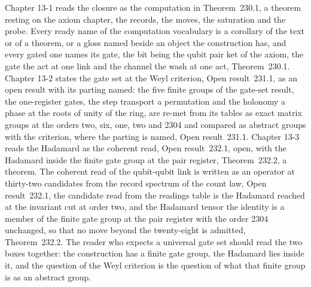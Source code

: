 Chapter 13-1 reads the closure as the computation in Theorem~230.1, a theorem resting on the axiom chapter, the records, the moves, the saturation and the probe. Every ready name of the computation vocabulary is a corollary of the text or of a theorem, or a gloss named beside an object the construction has, and every gated one names its gate, the bit being the qubit pair ket of the axiom, the gate the act at one link and the channel the wash at one act, Theorem~230.1. Chapter 13-2 states the gate set at the Weyl criterion, Open result~231.1, as an open result with its parting named: the five finite groups of the gate-set result, the one-register gates, the step transport a permutation and the holonomy a phase at the roots of unity of the ring, are re-met from its tables as exact matrix groups at the orders two, six, one, two and 2304 and compared as abstract groups with the criterion, where the parting is named, Open result~231.1. Chapter 13-3 reads the Hadamard as the coherent read, Open result~232.1, open, with the Hadamard inside the finite gate group at the pair register, Theorem~232.2, a theorem. The coherent read of the qubit-qubit link is written as an operator at thirty-two candidates from the record spectrum of the count law, Open result~232.1, the candidate read from the readings table is the Hadamard reached at the invariant cut at order two, and the Hadamard tensor the identity is a member of the finite gate group at the pair register with the order 2304 unchanged, so that no move beyond the twenty-eight is admitted, Theorem~232.2. The reader who expects a universal gate set should read the two boxes together: the construction has a finite gate group, the Hadamard lies inside it, and the question of the Weyl criterion is the question of what that finite group is as an abstract group.

